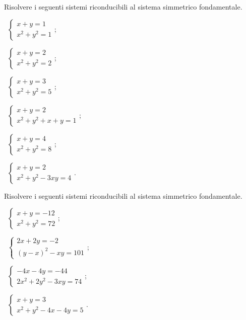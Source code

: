 \begin{esercizio}[\Ast]
\label{ese:6.28}
Risolvere i seguenti sistemi riconducibili al sistema simmetrico fondamentale.
\begin{multicols}{2}
 \begin{enumeratea}
 \item~$\left\{\begin{array}{l}x+y=1 \\x^2+y^2=1\end{array}\right.$;
 \item~$\left\{\begin{array}{l}x+y=2 \\x^2+y^2=2\end{array}\right.$;
 \item~$\left\{\begin{array}{l}x+y=3 \\x^2+y^2=5\end{array}\right.$;
 \item~$\left\{\begin{array}{l}x+y=2 \\x^2+y^2+x+y=1\end{array}\right.$;
 \item~$\left\{\begin{array}{l}x+y=4\\x^2+y^2=8\end{array}\right.$;
 \item~$\left\{\begin{array}{l}x+y=2 \\x^2+y^2-3xy=4\end{array}\right.$.
 \end{enumeratea}
 \end{multicols}
\end{esercizio}

\begin{esercizio}[\Ast]
\label{ese:6.29}
Risolvere i seguenti sistemi riconducibili al sistema simmetrico fondamentale.
\begin{multicols}{2}
 \begin{enumeratea}
 \item~$\left\{\begin{array}{l}{x+y=-12}\\{x^2+y^2=72}\end{array}\right.$;
 \item~$\left\{\begin{array}{l}{2x+2y=-2}\\{(y-x)^2-{xy}=101}\end{array}\right.$;
 \item~$\left\{\begin{array}{l}{-4x-4y=-44}\\{2x^2+2y^2-3{xy}=74}\end{array}\right.$;
 \item~$\left\{\begin{array}{l}x+y=3 \\x^2+y^2-4x-4y=5\end{array}\right.$.
 \end{enumeratea}
 \end{multicols}
\end{esercizio}

